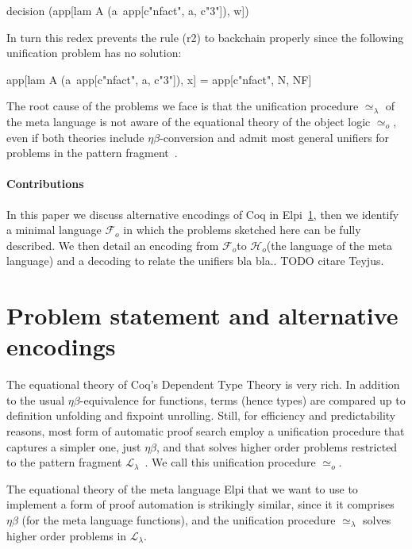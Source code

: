 \documentclass[sigconf,natbib=false]{acmart}
\newcommand{\UnifRel}{\ensuremath{\simeq}}
\newcommand{\Uo}{\ensuremath{\UnifRel_o}\xspace}
\newcommand{\Ue}{\ensuremath{\UnifRel_\lambda}\xspace}
\newcommand{\Fo}{\ensuremath{\mathcal{F}_{\!o}\xspace}} %
\newcommand{\Ho}{\ensuremath{\mathcal{H}_o}\xspace}
\begin{document}
\begin{elpicode}
decision (app[lam A (a\ app[c"nfact", a, c"3"]), w])
\end{elpicode}

\noindent
In turn this redex prevents the rule (r2) to backchain properly since
the following unification problem has no solution:

\begin{elpicode}
app[lam A (a\ app[c"nfact", a, c"3"]), x] =
app[c"nfact", N, NF]
\end{elpicode}

\noindent
The root cause of the problems we face is that the unification procedure
\Ue of the meta language is not aware of the equational theory of the object
logic \Uo, even if both theories include $\eta\beta$-conversion and admit most general
unifiers for problems in the pattern fragment~\cite{miller92jsc}.

\paragraph{Contributions}
In this paper we discuss alternative encodings of Coq in
Elpi~\ref{sec:encodings}, then we identify a minimal language \Fo
in which the problems sketched here can be fully described.
We then detail an encoding  from \Fo to \Ho (the language of
the meta language) and a decoding  to relate the unifiers
bla bla.. TODO citare Teyjus.

\section{Problem statement and alternative encodings} %
\label{sec:encodings}

The equational theory of Coq's Dependent Type Theory is very rich. In
addition to the usual $\eta\beta$-equivalence for functions, terms (hence types)
are compared up to definition unfolding and fixpoint unrolling. Still,
for efficiency and predictability reasons, most form of automatic proof search
employ a unification procedure that captures a simpler one,
just $\eta\beta$, and that solves higher order problems
restricted to the pattern fragment $\mathcal{L}_\lambda$~\cite{miller92jsc}.
We call this unification procedure \Uo{}.

The equational theory of the meta language Elpi that we want to use to
implement a form of proof automation is strikingly similar, since it
it comprises $\eta\beta$ (for the meta language functions), and the
unification procedure \Ue{} solves higher order problems in
$\mathcal{L}_\lambda$.
\end{document}

